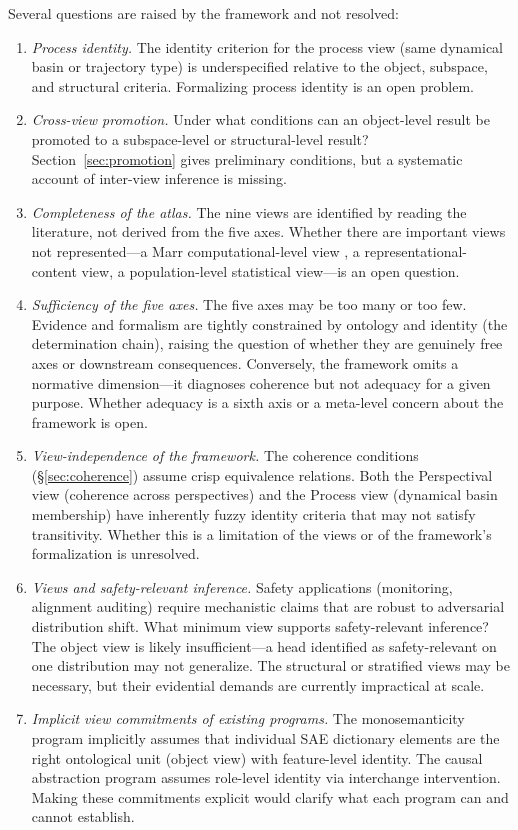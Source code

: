 \documentclass{article}
\begin{document}
Several questions are raised by the framework and not resolved:
\begin{enumerate}[leftmargin=*]
\item \emph{Process identity.}  The identity criterion for the process
      view (same dynamical basin or trajectory type) is underspecified
      relative to the object, subspace, and structural criteria.
      Formalizing process identity is an open problem.
\item \emph{Cross-view promotion.}  Under what conditions can an
      object-level result be promoted to a subspace-level or structural-level
      result?  Section~\ref{sec:promotion} gives preliminary conditions, but
      a systematic account of inter-view inference is missing.
\item \emph{Completeness of the atlas.}  The nine views are identified
      by reading the literature, not derived from the five axes.  Whether
      there are important views not represented---a Marr computational-level
      view \citep{marr1982}, a representational-content view, a
      population-level statistical view---is an open question.
\item \emph{Sufficiency of the five axes.}  The five axes may be too many
      or too few.  Evidence and formalism are tightly constrained by
      ontology and identity (the determination chain), raising the question
      of whether they are genuinely free axes or downstream consequences.
      Conversely, the framework omits a normative dimension---it diagnoses
      coherence but not adequacy for a given purpose.  Whether adequacy
      is a sixth axis or a meta-level concern about the framework is open.
\item \emph{View-independence of the framework.}  The coherence
      conditions (\S\ref{sec:coherence}) assume crisp equivalence
      relations.  Both the Perspectival view (coherence across
      perspectives) and the Process view (dynamical basin membership)
      have inherently fuzzy identity criteria that may not satisfy
      transitivity.  Whether this is a limitation of the views or of
      the framework's formalization is unresolved.
\item \emph{Views and safety-relevant inference.}  Safety applications
      (monitoring, alignment auditing) require mechanistic claims that are
      robust to adversarial distribution shift.  What minimum view supports
      safety-relevant inference?  The object view is likely insufficient---a
      head identified as safety-relevant on one distribution may not
      generalize.  The structural or stratified views may be necessary, but
      their evidential demands are currently impractical at scale.
\item \emph{Implicit view commitments of existing programs.}  The
      monosemanticity program \citep{bricken2023,templeton2024} implicitly
      assumes that individual SAE dictionary elements are the right ontological
      unit (object view) with feature-level identity.  The causal abstraction
      program \citep{geiger2021,geiger2024} assumes role-level identity via
      interchange intervention.  Making these commitments explicit would
      clarify what each program can and cannot establish.
\end{enumerate}
\end{document}
